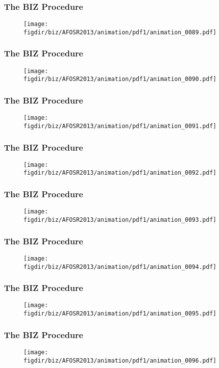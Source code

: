 \documentclass[13pt]{beamer}
\newcommand{\figdir}{../../fig}
\begin{document}
\begin{frame}\frametitle{The BIZ Procedure}\begin{figure}\texttt{[image: \\figdir/biz/AFOSR2013/animation/pdf1/animation\_0089.pdf]}\end{figure}\end{frame}
\begin{frame}\frametitle{The BIZ Procedure}\begin{figure}\texttt{[image: \\figdir/biz/AFOSR2013/animation/pdf1/animation\_0090.pdf]}\end{figure}\end{frame}
\begin{frame}\frametitle{The BIZ Procedure}\begin{figure}\texttt{[image: \\figdir/biz/AFOSR2013/animation/pdf1/animation\_0091.pdf]}\end{figure}\end{frame}
\begin{frame}\frametitle{The BIZ Procedure}\begin{figure}\texttt{[image: \\figdir/biz/AFOSR2013/animation/pdf1/animation\_0092.pdf]}\end{figure}\end{frame}
\begin{frame}\frametitle{The BIZ Procedure}\begin{figure}\texttt{[image: \\figdir/biz/AFOSR2013/animation/pdf1/animation\_0093.pdf]}\end{figure}\end{frame}
\begin{frame}\frametitle{The BIZ Procedure}\begin{figure}\texttt{[image: \\figdir/biz/AFOSR2013/animation/pdf1/animation\_0094.pdf]}\end{figure}\end{frame}
\begin{frame}\frametitle{The BIZ Procedure}\begin{figure}\texttt{[image: \\figdir/biz/AFOSR2013/animation/pdf1/animation\_0095.pdf]}\end{figure}\end{frame}
\begin{frame}\frametitle{The BIZ Procedure}\begin{figure}\texttt{[image: \\figdir/biz/AFOSR2013/animation/pdf1/animation\_0096.pdf]}\end{figure}\end{frame}
\end{document}
